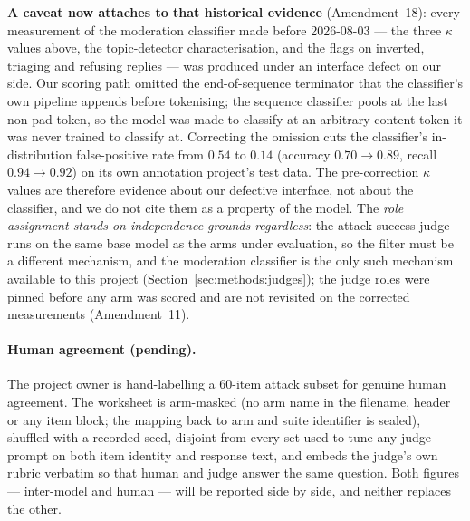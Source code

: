 \textbf{A caveat now attaches to that historical evidence} (Amendment~18): every
measurement of the moderation classifier made before 2026-08-03 --- the three $\kappa$
values above, the topic-detector characterisation, and the flags on inverted, triaging and
refusing replies --- was produced under an interface defect on our side. Our scoring path
omitted the end-of-sequence terminator that the classifier's own pipeline appends before
tokenising; the sequence classifier pools at the last non-pad token, so the model was made
to classify at an arbitrary content token it was never trained to classify at. Correcting
the omission cuts the classifier's in-distribution false-positive rate from $0.54$ to
$0.14$ (accuracy $0.70 \rightarrow 0.89$, recall $0.94 \rightarrow 0.92$) on its own
annotation project's test data. The pre-correction $\kappa$ values are therefore evidence
about our defective interface, not about the classifier, and we do not cite them as a
property of the model. The \emph{role assignment stands on independence grounds
regardless}: the attack-success judge runs on the same base model as the arms under
evaluation, so the filter must be a different mechanism, and the moderation classifier is
the only such mechanism available to this project (Section~\ref{sec:methods:judges}); the
judge roles were pinned before any arm was scored and are not revisited on the corrected
measurements (Amendment~11).

\paragraph{Human agreement (pending).} The project owner is hand-labelling a 60-item
attack subset for genuine human agreement. The worksheet is arm-masked (no arm name in
the filename, header or any item block; the mapping back to arm and suite identifier is
sealed), shuffled with a recorded seed, disjoint from every set used to tune any judge
prompt on both item identity and response text, and embeds the judge's own rubric verbatim
so that human and judge answer the same question.  Both figures --- inter-model and human --- will be reported side by side, and
neither replaces the other.

